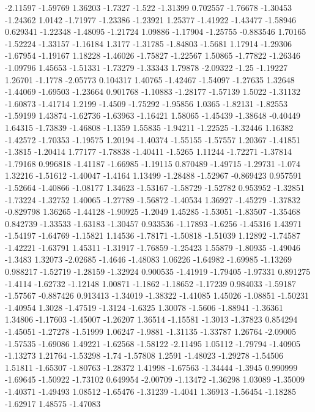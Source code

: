 \documentclass[9pt]{article}
\theoremstyle{plain}
\theoremstyle{definition}
\theoremstyle{remark}
\numberwithin{equation}{section}
\begin{document}
-2.11597
-1.59769
1.36203
-1.7327
-1.522
-1.31399
0.702557
-1.76678
-1.30453
-1.24362
1.0142
-1.71977
-1.23386
-1.23921
1.25377
-1.41922
-1.43477
-1.58946
0.629341
-1.22348
-1.48095
-1.21724
1.09886
-1.17904
-1.25755
-0.883546
1.70165
-1.52224
-1.33157
-1.16184
1.3177
-1.31785
-1.84803
-1.5681
1.17914
-1.29306
-1.67954
-1.19167
1.18228
-1.46026
-1.75827
-1.22567
1.50865
-1.77822
-1.26346
-1.09796
1.45653
-1.51331
-1.73279
-1.33343
1.79878
-2.09322
-1.25
-1.19227
1.26701
-1.1778
-2.05773
0.104317
1.40765
-1.42467
-1.54097
-1.27635
1.32648
-1.44069
-1.69503
-1.23664
0.901768
-1.10883
-1.28177
-1.57139
1.5022
-1.31132
-1.60873
-1.41714
1.2199
-1.4509
-1.75292
-1.95856
1.0365
-1.82131
-1.82553
-1.59199
1.43874
-1.62736
-1.63963
-1.16421
1.58065
-1.45439
-1.38648
-0.40449
1.64315
-1.73839
-1.46808
-1.1359
1.55835
-1.94211
-1.22525
-1.32446
1.16382
-1.42572
-1.70353
-1.19575
1.20194
-1.40374
-1.55155
-1.57557
1.20367
-1.41851
-1.3815
-1.20414
1.77177
-1.78838
-1.40411
-1.5265
1.11244
-1.72271
-1.37814
-1.79168
0.996818
-1.41187
-1.66985
-1.19115
0.870489
-1.49715
-1.29731
-1.074
1.32216
-1.51612
-1.40047
-1.4164
1.13499
-1.28488
-1.52967
-0.869423
0.957591
-1.52664
-1.40866
-1.08177
1.34623
-1.53167
-1.58729
-1.52782
0.953952
-1.32851
-1.73224
-1.32752
1.40065
-1.27789
-1.56872
-1.40534
1.36927
-1.45279
-1.37832
-0.829798
1.36265
-1.44128
-1.90925
-1.2049
1.45285
-1.53051
-1.83507
-1.35468
0.842739
-1.33533
-1.63183
-1.30457
0.933536
-1.17893
-1.6256
-1.45316
1.43971
-1.54197
-1.64769
-1.15821
1.14536
-1.78171
-1.50818
-1.51039
1.12892
-1.74587
-1.42221
-1.63791
1.45311
-1.31917
-1.76859
-1.25423
1.55879
-1.80935
-1.49046
-1.3483
1.32073
-2.02685
-1.4646
-1.48083
1.06226
-1.64982
-1.69985
-1.13269
0.988217
-1.52719
-1.28159
-1.32924
0.900535
-1.41919
-1.79405
-1.97331
0.891275
-1.4114
-1.62732
-1.12148
1.00871
-1.1862
-1.18652
-1.17239
0.984033
-1.59187
-1.57567
-0.887426
0.913413
-1.34019
-1.38322
-1.41085
1.45026
-1.08851
-1.50231
-1.40954
1.3028
-1.47519
-1.3124
-1.6325
1.30078
-1.5606
-1.88941
-1.36361
1.34806
-1.17603
-1.45007
-1.26207
1.36514
-1.15581
-1.3013
-1.37823
0.854294
-1.45051
-1.27278
-1.51999
1.06247
-1.9881
-1.31135
-1.33787
1.26764
-2.09005
-1.57535
-1.69086
1.49221
-1.62568
-1.58122
-2.11495
1.05112
-1.79794
-1.40905
-1.13273
1.21764
-1.53298
-1.74
-1.57808
1.2591
-1.48023
-1.29278
-1.54506
1.51811
-1.65307
-1.80763
-1.28372
1.41998
-1.67563
-1.34444
-1.3945
0.990999
-1.69645
-1.50922
-1.73102
0.649954
-2.00709
-1.13472
-1.36298
1.03089
-1.35009
-1.40371
-1.49493
1.08512
-1.65476
-1.31239
-1.4041
1.36913
-1.56454
-1.18285
-1.62917
1.48575
-1.47083
\end{document}
